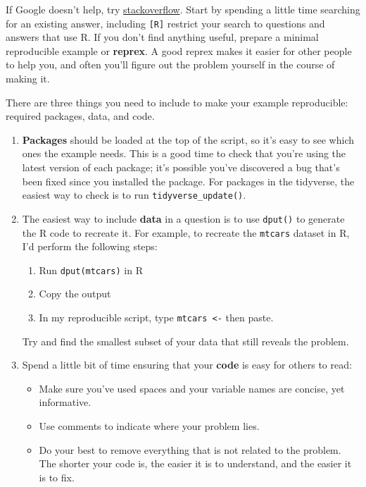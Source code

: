 \documentclass[]{book}
\providecommand{\tightlist}{%
  \setlength{\itemsep}{0pt}\setlength{\parskip}{0pt}}
\begin{document}
If Google doesn't help, try
\href{http://stackoverflow.com}{stackoverflow}. Start by spending a
little time searching for an existing answer, including \texttt{{[}R{]}}
restrict your search to questions and answers that use R. If you don't
find anything useful, prepare a minimal reproducible example or
\textbf{reprex}. A good reprex makes it easier for other people to help
you, and often you'll figure out the problem yourself in the course of
making it.

There are three things you need to include to make your example
reproducible: required packages, data, and code.

\begin{enumerate}
\def\labelenumi{\arabic{enumi}.}
\item
  \textbf{Packages} should be loaded at the top of the script, so it's
  easy to see which ones the example needs. This is a good time to check
  that you're using the latest version of each package; it's possible
  you've discovered a bug that's been fixed since you installed the
  package. For packages in the tidyverse, the easiest way to check is to
  run \texttt{tidyverse\_update()}.
\item
  The easiest way to include \textbf{data} in a question is to use
  \texttt{dput()} to generate the R code to recreate it. For example, to
  recreate the \texttt{mtcars} dataset in R, I'd perform the following
  steps:

  \begin{enumerate}
  \def\labelenumii{\arabic{enumii}.}
  \tightlist
  \item
    Run \texttt{dput(mtcars)} in R
  \item
    Copy the output
  \item
    In my reproducible script, type \texttt{mtcars\ \textless{}-} then
    paste.
  \end{enumerate}

  Try and find the smallest subset of your data that still reveals the
  problem.
\item
  Spend a little bit of time ensuring that your \textbf{code} is easy
  for others to read:

  \begin{itemize}
  \item
    Make sure you've used spaces and your variable names are concise,
    yet informative.
  \item
    Use comments to indicate where your problem lies.
  \item
    Do your best to remove everything that is not related to the
    problem.\\
    The shorter your code is, the easier it is to understand, and the
    easier it is to fix.
  \end{itemize}
\end{enumerate}
\end{document}
